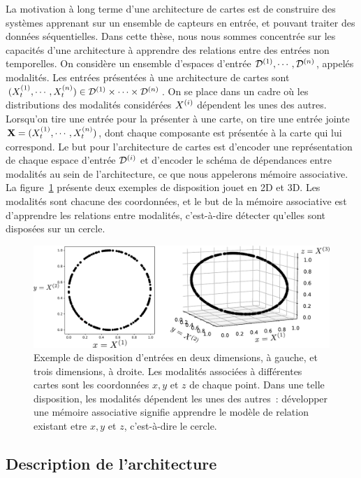 \documentclass[../main]{subfiles}
\begin{document}
La motivation à long terme d'une architecture de cartes est de construire des systèmes apprenant sur un ensemble de capteurs en entrée, et pouvant traiter des données séquentielles.
Dans cette thèse, nous nous sommes concentrée sur les capacités d'une architecture à apprendre des relations entre des entrées non temporelles. 
On considère un ensemble d'espaces d'entrée $\mathcal{D}^{({1})}, \cdots , \mathcal{D}^{({n})}$, appelés modalités.
Les entrées présentées à une architecture de cartes sont $(X^{({1})}_t, \cdots, X^{({n})}_t) \in \mathcal{D}^{({1})} \times \cdots \times \mathcal{D}^{({n})}$. On se place dans un cadre où les distributions des modalités considérées $X^{({i})}$ dépendent les unes des autres. 
Lorsqu'on tire une entrée pour la présenter à une carte, on tire une entrée jointe $\mathbf{X} =  (X^{({1})}_t, \cdots , X^{({n})}_t)$, dont chaque composante est présentée à la carte qui lui correspond. 
Le but pour l'architecture de cartes est d'encoder une représentation de chaque espace d'entrée $\mathcal{D}^{({i})}$ et d'encoder le schéma de dépendances entre modalités au sein de l'architecture, ce que nous appelerons mémoire associative.
La figure~\ref{fig:input_3som} présente deux exemples de disposition jouet en 2D et 3D. Les modalités sont chacune des coordonnées, et le but de la mémoire associative est d'apprendre les relations entre modalités, c'est-à-dire détecter qu'elles sont disposées sur un cercle.

\begin{figure}
\centering
\includegraphics[width=\textwidth]{inputs_3som}
\caption{Exemple de disposition d'entrées en deux dimensions, à gauche, et trois dimensions, à droite. Les modalités associées à différentes cartes sont les coordonnées $x,y$ et $z$ de chaque point. Dans une telle disposition, les modalités dépendent les unes des autres~: développer une mémoire associative signifie apprendre le modèle de relation existant etre $x,y$ et $z$, c'est-à-dire le cercle.\label{fig:input_3som}}
\end{figure}

\subsection{Description de l'architecture}
\end{document}
